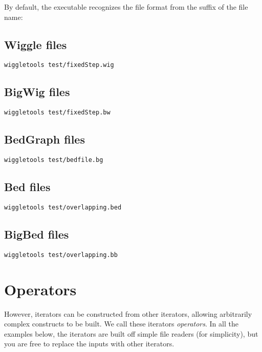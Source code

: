 \documentclass[12pt]{article}
\begin{document}
By default, the executable recognizes the file format from the suffix of the file name:

\subsection{Wiggle files}

\begin{verbatim}
wiggletools test/fixedStep.wig 
\end{verbatim}

\subsection{BigWig files}

\begin{verbatim}
wiggletools test/fixedStep.bw 
\end{verbatim}

\subsection{BedGraph files}

\begin{verbatim}
wiggletools test/bedfile.bg 
\end{verbatim}

\subsection{Bed files}

\begin{verbatim}
wiggletools test/overlapping.bed 
\end{verbatim}

\subsection{BigBed files}

\begin{verbatim}
wiggletools test/overlapping.bb 
\end{verbatim}

\section{Operators}

However, iterators can be constructed from other iterators, allowing arbitrarily complex constructs to be built. We call these iterators \emph{operators}. In all the examples below, the iterators are built off simple file readers (for simplicity), but you are free to replace the inputs with other iterators.
\end{document}
